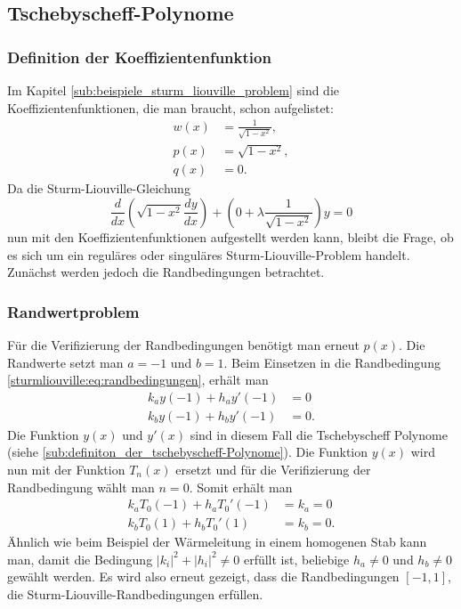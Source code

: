 %
%
%

\subsection{Tschebyscheff-Polynome
\label{sturmliouville:sub:tschebyscheff-polynome}}
\subsubsection*{Definition der Koeffizientenfunktion}
Im Kapitel \ref{sub:beispiele_sturm_liouville_problem} sind die
Koeffizientenfunktionen, die man braucht, schon aufgelistet:
\begin{align*}
	w(x) &= \frac{1}{\sqrt{1-x^2}}, \\
	p(x) &= \sqrt{1-x^2}, \\
	q(x) &= 0.
\end{align*}
Da die Sturm-Liouville-Gleichung
\begin{equation}
	\label{eq:sturm-liouville-equation-tscheby}
	\frac{d}{dx} (\sqrt{1-x^2} \frac{dy}{dx}) +
	(0 + \lambda \frac{1}{\sqrt{1-x^2}}) y
	=
	0 
\end{equation}
nun mit den Koeffizientenfunktionen aufgestellt werden kann, bleibt die Frage,
ob es sich um ein reguläres oder singuläres Sturm-Liouville-Problem handelt.
Zunächst werden jedoch die Randbedingungen betrachtet.

\subsubsection*{Randwertproblem}
Für die Verifizierung der Randbedingungen benötigt man erneut $p(x)$.
Die Randwerte setzt man $a = -1$ und $b = 1$.
Beim Einsetzen in die Randbedingung \eqref{sturmliouville:eq:randbedingungen},
erhält man
\begin{equation}
	\begin{aligned}
		k_a y(-1) + h_a y'(-1) &= 0\\
		k_b y(-1) + h_b y'(-1) &= 0.
	\end{aligned} 
\end{equation}
Die Funktion $y(x)$ und $y'(x)$ sind in diesem Fall die Tschebyscheff Polynome
(siehe \ref{sub:definiton_der_tschebyscheff-Polynome}).
Die Funktion $y(x)$ wird nun mit der Funktion $T_n(x)$ ersetzt und für die
Verifizierung der Randbedingung wählt man $n=0$.
Somit erhält man
\begin{equation}
	\begin{aligned}
		k_a T_0(-1) + h_a T_{0}'(-1) &= k_a = 0\\
		k_b T_0(1) + h_b T_{0}'(1) &= k_b = 0.
	\end{aligned}
\end{equation}
Ähnlich wie beim Beispiel der Wärmeleitung in einem homogenen Stab kann man,
damit die Bedingung $|k_i|^2 + |h_i|^2\ne 0$ erfüllt ist, beliebige
$h_a \ne 0$ und $h_b \ne 0$ gewählt werden.
Es wird also erneut gezeigt, dass die Randbedingungen $[-1,1]$,
die Sturm-Liouville-Randbedingungen erfüllen.

